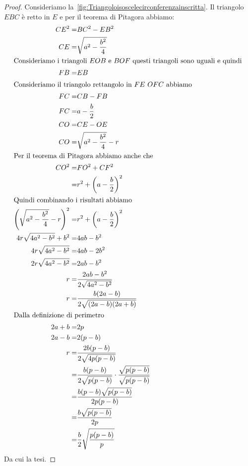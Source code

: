 \begin{proof}
	Consideriamo la~\cref{fig:Triangoloisoscelecirconferenzainscritta}.
	Il triangolo $EBC$ è retto in $E$ e per il teorema di Pitagora abbiamo:  \begin{align*}
		CE^2=&BC^2-EB^2\\
		CE=&\sqrt{a^2-\dfrac{b^2}{4}}\\
		\intertext{Consideriamo i triangoli $EOB$ e $BOF$ questi triangoli sono uguali e quindi }
		FB=&EB\\
		\intertext{Consideriamo il triangolo rettangolo in $FE$ $OFC$ abbiamo}
		FC=&CB-FB\\
		FC=&a-\dfrac{b}{2}\\
		CO=&CE-OE\\
		CO=&\sqrt{a^2-\dfrac{b^2}{4}}-r\\
		\intertext{Per il teorema di Pitagora abbiamo anche che}
		CO^2=&FO^2+CF^2\\
		=&r^2+\left(a-\dfrac{b}{2}\right)^2\\
		\intertext{Quindi combinando i risultati abbiamo}
		\left(\sqrt{a^2-\dfrac{b^2}{4}}-r\right)^2=&r^2+\left(a-\dfrac{b}{2}\right)^2\\
		4r\sqrt{4a^2-b^2}+b^2=&4ab-b^2\\
		4r\sqrt{4a^2-b^2}=&4ab-2b^2\\
		2r\sqrt{4a^2-b^2}=&2ab-b^2\\
		r=&\dfrac{2ab-b^2}{2\sqrt{4a^2-b^2}}\\
		r=&\dfrac{b(2a-b)}{2\sqrt{(2a-b)(2a+b)}}\\
		\intertext{Dalla definizione di perimetro}
		2a+b=&2p\\
		2a-b=&2(p-b)\\
		r=&\dfrac{2b(p-b)}{2\sqrt{4p(p-b)}}\\
		=&\dfrac{b(p-b)}{2\sqrt{p(p-b)}}\cdot\dfrac{\sqrt{p(p-b)}}{\sqrt{p(p-b)}}\\
		=&\dfrac{b(p-b)\sqrt{p(p-b)}}{2p(p-b)}\\
		=&\dfrac{b\sqrt{p(p-b)}}{2p}\\
		=&\dfrac{b}{2}\sqrt{\dfrac{p(p-b)}{p}}\\
		\end{align*}
		Da cui la tesi.
\end{proof}
